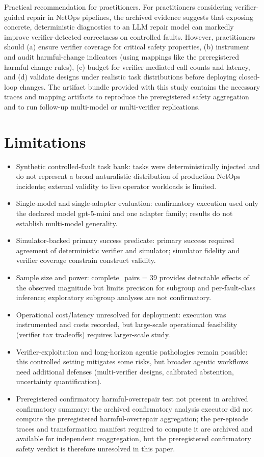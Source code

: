 \documentclass[conference]{IEEEtran}
\begin{document}
Practical recommendation for practitioners. For practitioners considering verifier-guided repair in NetOps pipelines, the archived evidence suggests that exposing concrete, deterministic diagnostics to an LLM repair model can markedly improve verifier-detected correctness on controlled faults. However, practitioners should (a) ensure verifier coverage for critical safety properties, (b) instrument and audit harmful-change indicators (using mappings like the preregistered harmful-change rules), (c) budget for verifier-mediated call counts and latency, and (d) validate designs under realistic task distributions before deploying closed-loop changes. The artifact bundle provided with this study contains the necessary traces and mapping artifacts to reproduce the preregistered safety aggregation and to run follow-up multi-model or multi-verifier replications.

\section{Limitations}
\begin{itemize}
\item Synthetic controlled-fault task bank: tasks were deterministically injected and do not represent a broad naturalistic distribution of production NetOps incidents; external validity to live operator workloads is limited.
\item Single-model and single-adapter evaluation: confirmatory execution used only the declared model gpt-5-mini and one adapter family; results do not establish multi-model generality.
\item Simulator-backed primary success predicate: primary success required agreement of deterministic verifier and simulator; simulator fidelity and verifier coverage constrain construct validity.
\item Sample size and power: complete\_pairs = 39 provides detectable effects of the observed magnitude but limits precision for subgroup and per-fault-class inference; exploratory subgroup analyses are not confirmatory.
\item Operational cost/latency unresolved for deployment: execution was instrumented and costs recorded, but large-scale operational feasibility (verifier tax tradeoffs) requires larger-scale study.
\item Verifier-exploitation and long-horizon agentic pathologies remain possible: this controlled setting mitigates some risks, but broader agentic workflows need additional defenses (multi-verifier designs, calibrated abstention, uncertainty quantification).
\item Preregistered confirmatory harmful-overrepair test not present in archived confirmatory summary: the archived confirmatory analysis executor did not compute the preregistered harmful-overrepair aggregation; the per-episode traces and transformation manifest required to compute it are archived and available for independent reaggregation, but the preregistered confirmatory safety verdict is therefore unresolved in this paper.
\end{itemize}
\end{document}
